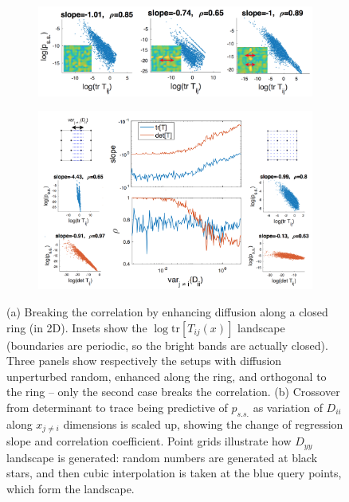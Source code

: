 \documentclass[reprint,prx]{revtex4-1}
\newcommand{\tr}{\mbox{tr}}
\renewcommand{\=}[1]{\stackrel{#1}{=}} %
\renewcommand{\(}{\left (}
\renewcommand{\)}{\right  )}
\renewcommand{\[}{\left [}
\renewcommand{\]}{\right ]}
\newcommand{\<}{\left <}
\renewcommand{\>}{\right >}
\theoremstyle{definition}
\theoremstyle{remark}
\begin{document}
\begin{figure} 
	\begin{subfigure}[t]{0.5\textwidth}
		\caption{\label{fig:randDiff2D_br}}
		\includegraphics[width=1\textwidth]{randDiff2D_break.png}
	\end{subfigure}
\begin{subfigure}[t]{0.5\textwidth}
	\caption{\label{fig:trVdet_crossover}}
	\includegraphics[width=1\textwidth]{trVdet_crossover.png}
\end{subfigure}
	
	\caption{(a) Breaking the correlation by enhancing diffusion along a closed ring (in 2D). Insets show the $ \log\tr\[T_{ij}(x)\] $ landscape (boundaries are periodic, so the bright bands are actually closed). Three panels show respectively the setups with diffusion unperturbed random, enhanced along the ring, and orthogonal to the ring -- only the second case breaks the correlation. (b) Crossover from determinant to trace being predictive of $ p_{s.s.} $ as variation of $ D_{ii} $ along $ x_{j\neq i} $ dimensions is scaled up, showing the change of regression slope and correlation coefficient. Point grids illustrate how $ D_{yy} $ landscape is generated: random numbers are generated at black stars, and then cubic interpolation is taken at the blue query points, which form the landscape.} \label{fig:randDiff_more}
\end{figure}
\end{document}
